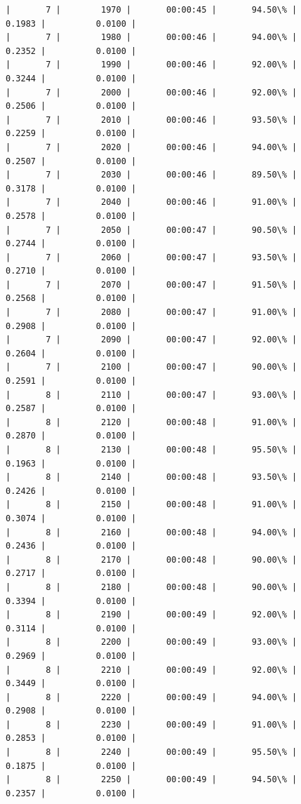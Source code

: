 \documentclass[11pt]{article}
\begin{document}
\begin{Verbatim}[commandchars=\\\{\}]
|       7 |        1970 |       00:00:45 |       94.50\% |       0.1983 |          0.0100 |
|       7 |        1980 |       00:00:46 |       94.00\% |       0.2352 |          0.0100 |
|       7 |        1990 |       00:00:46 |       92.00\% |       0.3244 |          0.0100 |
|       7 |        2000 |       00:00:46 |       92.00\% |       0.2506 |          0.0100 |
|       7 |        2010 |       00:00:46 |       93.50\% |       0.2259 |          0.0100 |
|       7 |        2020 |       00:00:46 |       94.00\% |       0.2507 |          0.0100 |
|       7 |        2030 |       00:00:46 |       89.50\% |       0.3178 |          0.0100 |
|       7 |        2040 |       00:00:46 |       91.00\% |       0.2578 |          0.0100 |
|       7 |        2050 |       00:00:47 |       90.50\% |       0.2744 |          0.0100 |
|       7 |        2060 |       00:00:47 |       93.50\% |       0.2710 |          0.0100 |
|       7 |        2070 |       00:00:47 |       91.50\% |       0.2568 |          0.0100 |
|       7 |        2080 |       00:00:47 |       91.00\% |       0.2908 |          0.0100 |
|       7 |        2090 |       00:00:47 |       92.00\% |       0.2604 |          0.0100 |
|       7 |        2100 |       00:00:47 |       90.00\% |       0.2591 |          0.0100 |
|       8 |        2110 |       00:00:47 |       93.00\% |       0.2587 |          0.0100 |
|       8 |        2120 |       00:00:48 |       91.00\% |       0.2870 |          0.0100 |
|       8 |        2130 |       00:00:48 |       95.50\% |       0.1963 |          0.0100 |
|       8 |        2140 |       00:00:48 |       93.50\% |       0.2426 |          0.0100 |
|       8 |        2150 |       00:00:48 |       91.00\% |       0.3074 |          0.0100 |
|       8 |        2160 |       00:00:48 |       94.00\% |       0.2436 |          0.0100 |
|       8 |        2170 |       00:00:48 |       90.00\% |       0.2717 |          0.0100 |
|       8 |        2180 |       00:00:48 |       90.00\% |       0.3394 |          0.0100 |
|       8 |        2190 |       00:00:49 |       92.00\% |       0.3114 |          0.0100 |
|       8 |        2200 |       00:00:49 |       93.00\% |       0.2969 |          0.0100 |
|       8 |        2210 |       00:00:49 |       92.00\% |       0.3449 |          0.0100 |
|       8 |        2220 |       00:00:49 |       94.00\% |       0.2908 |          0.0100 |
|       8 |        2230 |       00:00:49 |       91.00\% |       0.2853 |          0.0100 |
|       8 |        2240 |       00:00:49 |       95.50\% |       0.1875 |          0.0100 |
|       8 |        2250 |       00:00:49 |       94.50\% |       0.2357 |          0.0100 |

\end{Verbatim}
\end{document}

